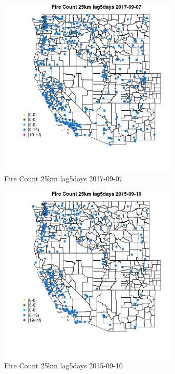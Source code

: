 \begin{figure} 
\centering  
\includegraphics[width=0.77\textwidth]{Code_Outputs/Report_ML_input_PM25_Step4_part_e_de_duplicated_aves_compiled_2019-05-21wNAs_MapObsFire_Count_25km_lag5days2017-09-07.jpg} 
\caption{\label{fig:Report_ML_input_PM25_Step4_part_e_de_duplicated_aves_compiled_2019-05-21wNAsMapObsFire_Count_25km_lag5days2017-09-07}Fire Count 25km lag5days 2017-09-07} 
\end{figure} 
 

\begin{figure} 
\centering  
\includegraphics[width=0.77\textwidth]{Code_Outputs/Report_ML_input_PM25_Step4_part_e_de_duplicated_aves_compiled_2019-05-21wNAs_MapObsFire_Count_25km_lag5days2015-09-10.jpg} 
\caption{\label{fig:Report_ML_input_PM25_Step4_part_e_de_duplicated_aves_compiled_2019-05-21wNAsMapObsFire_Count_25km_lag5days2015-09-10}Fire Count 25km lag5days 2015-09-10} 
\end{figure} 
 

